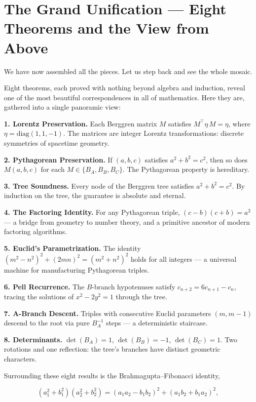\ornbreak



\section{The Grand Unification --- Eight Theorems and the View from Above}


We have now assembled all the pieces. Let us step back and see the whole mosaic.

Eight theorems, each proved with nothing beyond algebra and induction, reveal one of the most beautiful correspondences in all of mathematics. Here they are, gathered into a single panoramic view:

\textbf{1. Lorentz Preservation.} Each Berggren matrix $M$ satisfies $M^\top \eta\, M = \eta$, where $\eta = \mathrm{diag}(1, 1, -1)$. The matrices are integer Lorentz transformations: discrete symmetries of spacetime geometry.

\textbf{2. Pythagorean Preservation.} If $(a, b, c)$ satisfies $a^2 + b^2 = c^2$, then so does $M(a, b, c)$ for each $M \in \{B_A, B_B, B_C\}$. The Pythagorean property is hereditary.

\textbf{3. Tree Soundness.} Every node of the Berggren tree satisfies $a^2 + b^2 = c^2$. By induction on the tree, the guarantee is absolute and eternal.

\textbf{4. The Factoring Identity.} For any Pythagorean triple, $(c - b)(c + b) = a^2$ --- a bridge from geometry to number theory, and a primitive ancestor of modern factoring algorithms.

\textbf{5. Euclid's Parametrization.} The identity $(m^2 - n^2)^2 + (2mn)^2 = (m^2 + n^2)^2$ holds for all integers --- a universal machine for manufacturing Pythagorean triples.

\textbf{6. Pell Recurrence.} The $B$-branch hypotenuses satisfy $c_{n+2} = 6c_{n+1} - c_n$, tracing the solutions of $x^2 - 2y^2 = 1$ through the tree.

\textbf{7. A-Branch Descent.} Triples with consecutive Euclid parameters $(m, m-1)$ descend to the root via pure $B_A^{-1}$ steps --- a deterministic staircase.

\textbf{8. Determinants.} $\det(B_A) = 1$, $\det(B_B) = -1$, $\det(B_C) = 1$. Two rotations and one reflection: the tree's branches have distinct geometric characters.

Surrounding these eight results is the Brahmagupta–Fibonacci identity,

\[
(a_1^2 + b_1^2)(a_2^2 + b_2^2) = (a_1 a_2 - b_1 b_2)^2 + (a_1 b_2 + b_1 a_2)^2,
\]

